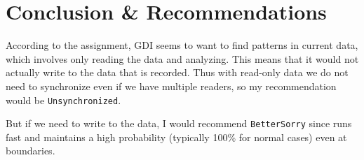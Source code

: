 \documentclass[10pt]{article}
\begin{document}
\section{Conclusion \& Recommendations}

According to the assignment, GDI seems to want to find patterns in current data, which involves only reading the data and analyzing. This means that it would not actually write to the data that is recorded. Thus with read-only data we do not need to synchronize even if we have multiple readers, so my recommendation would be \texttt{Unsynchronized}.

But if we need to write to the data, I would recommend \texttt{BetterSorry} since runs fast and maintains a high probability (typically 100\% for normal cases) even at boundaries.
\end{document}
